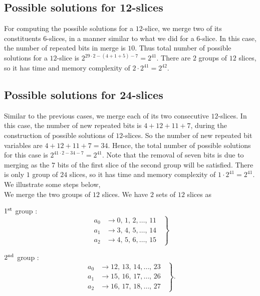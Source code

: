 \subsection{Possible solutions for 12-slices} 
For computing the possible solutions for a $12$-slice, we merge two of its constituents $6$-slices, in a manner similar to what we did for a $6$-slice. In this case, the number of repeated bits in merge is $10$. Thus total number of possible solutions for a $12$-slice is $2^{29 \cdot 2 - (4 + 1 + 5) - 7} = 2^{41}$. There are $2$ groups of $12$ slices, so it has time and memory complexity of $2 \cdot 2^{41} = 2^{42}$.

\subsection{Possible solutions for 24-slices}  
Similar to the previous cases, we merge each of its two consecutive $12$-slices. 
In this case, the number of new repeated bits is $4 + 12 + 11 + 7$, during the construction of possible solutions of $12$-slices. So the number of new repeated bit variables are $4 + 12 + 11 + 7 = 34$.
Hence, the total number of possible solutions for this case is $2^{41\cdot 2 - 34 - 7} = 2^{41}$. Note that the removal of seven bits is due to merging as the $7$ bits of the first slice of the second group will be satisfied. There is only $1$ group of $24$ slices, so it has time and memory complexity of $1 \cdot 2^{41} = 2^{41}$. We illustrate some steps below, \\

We merge the two groups of $12$ slices.
We have $2$ sets of $12$ slices as

$1^{\rm st}$ group :
\begin{equation}\label{48_sol_1}
    \left.
    \begin{aligned}
        a_0 &\rightarrow 0,\, 1,\, 2, \ldots ,\, 11\\
        a_1 &\rightarrow 3,\,4, \,5, \ldots ,\, 14\\
        a_2 &\rightarrow 4,\,5,\,6, \ldots ,\, 15
    \end{aligned}
    \;\;\right\}
\end{equation}

$2^{\rm nd}$ group :
\begin{equation}\label{48_sol_2}
    \left.
    \begin{aligned}    
      a_0 & \rightarrow 12,\, 13,\, 14, \ldots , \,23\\
      a_1 & \rightarrow 15,\, 16, \,17, \ldots , \,26\\
      a_2 & \rightarrow 16,\, 17,\,18, \ldots , \,27
    \end{aligned}
    \;\;\right\}.
\end{equation}

